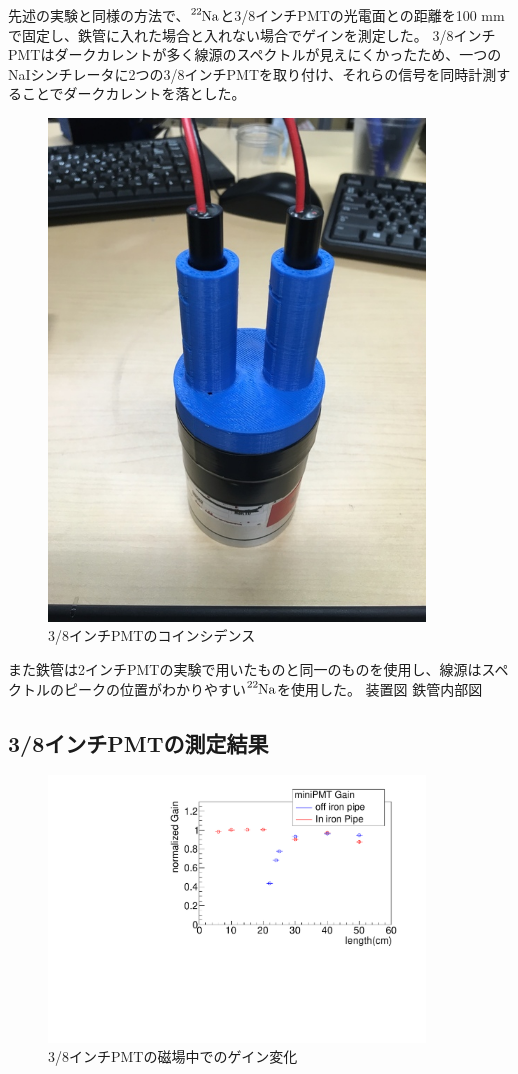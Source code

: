 先述の実験と同様の方法で、$\ce{^{22}Na}$と3/8インチPMTの光電面との距離を100 mmで固定し、鉄管に入れた場合と入れない場合でゲインを測定した。
3/8インチPMTはダークカレントが多く線源のスペクトルが見えにくかったため、一つのNaIシンチレータに2つの3/8インチPMTを取り付け、それらの信号を同時計測することでダークカレントを落とした。
\begin{figure}[H]
	\centering
		\includegraphics[width=10cm]{fig/iguchi/PPMT.jpg}
	\caption{3/8インチPMTのコインシデンス}
	\label{3/8inchcoin}
\end{figure}
また鉄管は2インチPMTの実験で用いたものと同一のものを使用し、線源はスペクトルのピークの位置がわかりやすい$\ce{^{22}Na}$を使用した。
装置図
鉄管内部図

\subsection{3/8インチPMTの測定結果}
\begin{figure}[H]
	\centering
		\includegraphics[angle=-90,width=10cm]{fig/iguchi/miniPMTgainG.pdf}
	\caption{3/8インチPMTの磁場中でのゲイン変化}
	\label{miniPMTgainG}
\end{figure}

